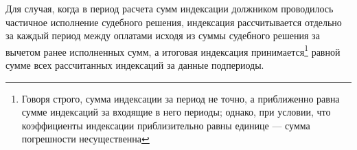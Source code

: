 \documentclass[a4paper,12pt,draft]{article}
\begin{document}

Для случая, когда в период расчета сумм индексации должником проводилось частичное исполнение судебного решения, индексация рассчитывается отдельно за каждый период между оплатами исходя из суммы судебного решения за вычетом ранее исполненных сумм, а итоговая индексация принимается\footnote{Говоря строго, сумма индексации за период не точно, а приближенно равна сумме индексаций за входящие в него периоды; однако, при условии, что коэффициенты индексации приблизительно равны единице --- сумма погрешности несущественна} равной сумме всех рассчитанных индексаций за данные подпериоды.
\end{document}
